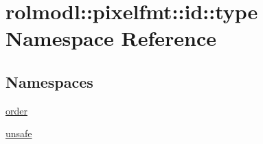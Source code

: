 \hypertarget{namespacerolmodl_1_1pixelfmt_1_1id_1_1type}{}\section{rolmodl\+::pixelfmt\+::id\+::type Namespace Reference}
\label{namespacerolmodl_1_1pixelfmt_1_1id_1_1type}
\subsection*{Namespaces}
\begin{DoxyCompactItemize}
\item 
 \mbox{\hyperlink{namespacerolmodl_1_1pixelfmt_1_1id_1_1type_1_1order}{order}}
\item 
 \mbox{\hyperlink{namespacerolmodl_1_1pixelfmt_1_1id_1_1type_1_1unsafe}{unsafe}}
\end{DoxyCompactItemize}
